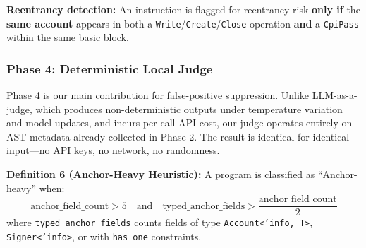\documentclass{article}
\begin{document}
\textbf{Reentrancy detection:} An instruction is flagged for reentrancy risk \textbf{only if} the \textbf{same account} appears in both a \texttt{Write}/\texttt{Create}/\texttt{Close} operation \textbf{and} a \texttt{CpiPass} within the same basic block.

\subsubsection{Phase 4: Deterministic Local Judge}

Phase 4 is our main contribution for false-positive suppression. Unlike LLM-as-a-judge, which produces non-deterministic outputs under temperature variation and model updates, and incurs per-call API cost, our judge operates entirely on AST metadata already collected in Phase 2. The result is identical for identical input---no API keys, no network, no randomness.

\textbf{Definition 6 (Anchor-Heavy Heuristic):} A program is classified as ``Anchor-heavy'' when:
\begin{equation}
  \text{anchor\_field\_count} > 5 \quad \text{and} \quad \text{typed\_anchor\_fields} > \frac{\text{anchor\_field\_count}}{2}
  \label{eq:anchor_heavy}
\end{equation}
where \texttt{typed\_anchor\_fields} counts fields of type \texttt{Account<'info, T>}, \texttt{Signer<'info>}, or with \texttt{has\_one} constraints.
\end{document}
